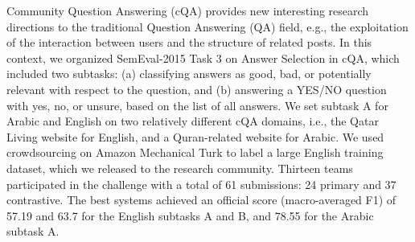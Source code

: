 Community Question Answering (cQA) provides new interesting research directions to the traditional Question Answering (QA) field, e.g., the exploitation of the interaction between users and the structure of related posts. In this context, we organized SemEval-2015 Task 3 on Answer Selection in cQA, which included two subtasks: (a) classifying answers as good, bad, or potentially relevant with respect to the question, and (b) answering a YES/NO question with yes, no, or unsure, based on the list of all answers. We set subtask A for Arabic and English on two relatively different cQA domains, i.e., the Qatar Living website for English, and a Quran-related website for Arabic. We used crowdsourcing on Amazon Mechanical Turk to label a large English training dataset, which we released to the research community. Thirteen teams participated in the challenge with a total of 61 submissions: 24 primary and 37 contrastive. The best systems achieved an official score (macro-averaged F1) of 57.19 and 63.7 for the English subtasks A and B, and 78.55 for the Arabic subtask A.
